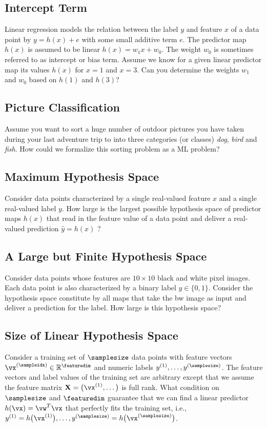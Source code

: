 \documentclass[12pt]{report}
\newcommand{\featurelen}{\featuredim}
\begin{document}
 \subsection{Intercept Term}
 \label{ex_2_5}
 Linear regression models the relation between the label $y$ and feature $x$ of 
 a data point by $y = h(x) + e$ with some small additive term $e$. The predictor 
 map $h(x)$ is assumed to be linear $h(x) =w_1 x + w_0$. The weight $w_{0}$ is 
 sometimes referred to as intercept or bias term. Assume we know for a given 
 linear predictor map its values $h(x)$ for $x=1$ and $x=3$. Can you determine 
 the weights $w_{1}$ and $w_{0}$ based on $h(1)$ and $h(3)$?
 
 \subsection{Picture Classification} 
 \label{ex_2_6}
Assume you want to sort a huge number of outdoor pictures you have taken during 
your last adventure trip to into three categories (or classes) 
\emph{dog}, \emph{bird} and \emph{fish}. How could we formalize this sorting 
problem as a ML problem? 

 \subsection{Maximum Hypothesis Space} 
\label{ex_2_7}
Consider data points characterized by a single real-valued feature $x$ and a 
single real-valued label $y$. How large is the largest possible hypothesis space 
of predictor maps $h(x)$ that read in the feature value of a data point and 
deliver a real-valued prediction $\hat{y}=h(x)$ ? 

 \subsection{A Large but Finite Hypothesis Space} 
\label{ex_2_8}
Consider data points whose features are $10 \times 10$ black and white pixel images. 
Each data point is also characterized by a binary label $y \in \{0,1\}$. Consider the 
hypothesis space constitute by all maps that take the bw image as input and deliver 
a prediction for the label. How large is this hypothesis space? 

\subsection{Size of Linear Hypothesis Space} 
\label{ex_size_lin_hypospace} 
Consider a training set of $\samplesize$ data points with feature 
vectors $\vx^{(\sampleidx)} \in \mathbb{R}^{\featuredim}$ and 
numeric labels $y^{(1)},\ldots,y^{(\samplesize)}$. The feature vectors 
and label values of the training set are arbitrary except that we assume 
the feature matrix $\mathbf{X} = \big(\vx^{(1)},\ldots \big)$ is full rank. 
What condition on $\samplesize$ and $\featurelen$ guarantee that we 
can find a linear predictor $h(\vx) = \vw^{T} \vx$ that perfectly fits the 
training set, i.e., $y^{(1)} = h\big(\vx^{(1)} \big),\ldots, y^{(\samplesize)} = h\big(\vx^{(\samplesize)} \big)$. 
\end{document}
